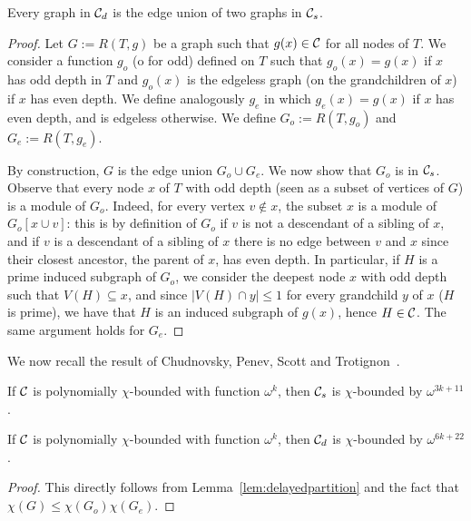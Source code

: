\documentclass[11pt]{article}
\numberwithin{equation}{section}
\begin{document}
\begin{lemma}\label{lem:delayedpartition}
Every graph in ${\cal C}_d$ is the edge union of two graphs in ${\cal C}_s$.
\end{lemma}
\begin{proof}
Let $G:=R(T,g)$ be a graph such that $g(x)\in \cal C$ for all nodes of $T$. We consider a function $g_o$ (o for odd)  defined on $T$ such that  $g_o(x)=g(x)$ if $x$ has odd depth in $T$ and $g_o(x)$ is the edgeless graph (on the grandchildren of $x$) if $x$ has even depth. We define analogously $g_e$ in which $g_e(x)=g(x)$ if $x$ has even depth, and is edgeless otherwise. We define $G_o:=R(T,g_o)$ and $G_e:=R(T,g_e)$.

By construction, $G$ is the edge union $G_o\cup G_e$. We now show that $G_o$ is in ${\cal C}_s$. Observe that every node $x$ of $T$ with odd depth  (seen as a subset of vertices of $G$) is a module of $G_o$. Indeed, for every vertex $v\notin x$, the subset $x$ is a module of $G_o[x\cup v]$: this is by definition of $G_o$ if $v$ is not a descendant of a sibling of $x$, and if $v$ is a descendant of a sibling of $x$ there is no edge between $v$ and $x$ since their closest ancestor, the parent of $x$, has even depth.
In particular, if $H$ is a prime induced subgraph of $G_o$, we consider the deepest node $x$ with odd depth such that $V(H)\subseteq x$, and since $|V(H)\cap y|\leq 1$ for every grandchild $y$ of $x$ ($H$ is prime), we have that $H$ is an induced subgraph of $g(x)$, hence $H\in \cal C$. The same argument holds for $G_e$.
\end{proof}

We now recall the result of Chudnovsky, Penev, Scott and Trotignon~\cite{CPST13}.

\begin{theorem}\label{th:cpst}
If $\cal C$ is polynomially $\chi$-bounded with function $\omega^k$, then ${\cal C}_s$ is $\chi$-bounded by $\omega^{3k+11}$.
\end{theorem}

\begin{corollary}\label{cor:delay}
If $\cal C$ is polynomially $\chi$-bounded with function $\omega^k$, then ${\cal C}_d$ is $\chi$-bounded by $\omega^{6k+22}$.
\end{corollary}

\begin{proof} This directly follows from Lemma~\ref{lem:delayedpartition} and the fact that $\chi (G)\leq \chi (G_o)\chi (G_e)$.
\end{proof}
\end{document}
